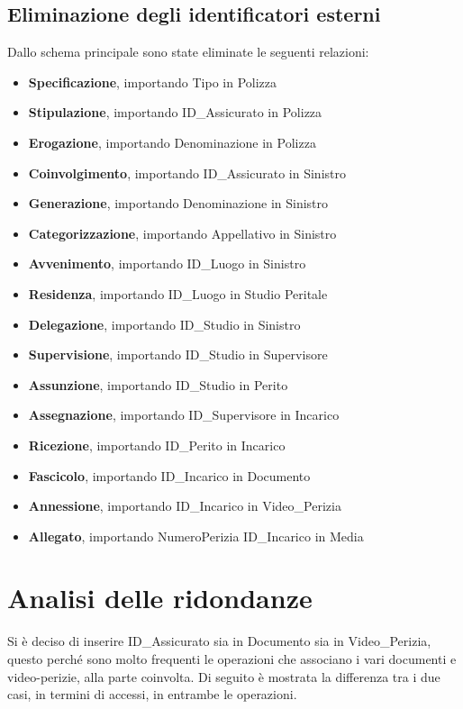 \documentclass[a4paper,12pt]{report}
\begin{document}
\subsection{Eliminazione degli identificatori esterni}
Dallo schema principale sono state eliminate le seguenti relazioni:
\begin{itemize}
    \item \textbf{Specificazione}, importando Tipo in Polizza
    \item \textbf{Stipulazione}, importando ID\_Assicurato in Polizza
    \item \textbf{Erogazione}, importando Denominazione in Polizza
    \item \textbf{Coinvolgimento}, importando ID\_Assicurato in Sinistro
    \item \textbf{Generazione}, importando Denominazione in Sinistro
    \item \textbf{Categorizzazione}, importando Appellativo in Sinistro
    \item \textbf{Avvenimento}, importando ID\_Luogo in Sinistro
    \item \textbf{Residenza}, importando ID\_Luogo in Studio Peritale
    \item \textbf{Delegazione}, importando ID\_Studio in Sinistro
    \item \textbf{Supervisione}, importando ID\_Studio in Supervisore
    \item \textbf{Assunzione}, importando ID\_Studio in Perito
    \item \textbf{Assegnazione}, importando ID\_Supervisore in Incarico
    \item \textbf{Ricezione}, importando ID\_Perito in Incarico
    \item \textbf{Fascicolo}, importando ID\_Incarico in Documento
    \item \textbf{Annessione}, importando ID\_Incarico in Video\_Perizia
    \item \textbf{Allegato}, importando NumeroPerizia ID\_Incarico in Media
\end{itemize}
\clearpage
\section{Analisi delle ridondanze}
Si è deciso di inserire ID\_Assicurato sia in Documento sia in Video\_Perizia, questo perché sono molto frequenti le operazioni che associano i vari documenti e video-perizie, alla parte coinvolta. Di seguito è mostrata la differenza tra i due casi, in termini di accessi, in entrambe le operazioni.
\\
\end{document}
